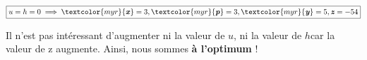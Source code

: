 \documentclass{report}
\begin{document}
\begin{multicols*}{3}
\begin{align*}
\boxed{u = h = 0 \implies 
\textcolor{myr}{\textbf{\textit{x}}}  = 3, 
\textcolor{myr}{\textbf{\textit{p}}} = 3,
\textcolor{myr}{\textbf{\textit{y}}} = 5,
\textbf{\textit{z}} = -54}
\end{align*}

Il n’est pas intéressant d’augmenter ni la valeur de $u$, ni la valeur de $h$car la valeur 
de z augmente. Ainsi, nous sommes \textbf{à l’optimum} !





\end{multicols*}
            
\end{document}
